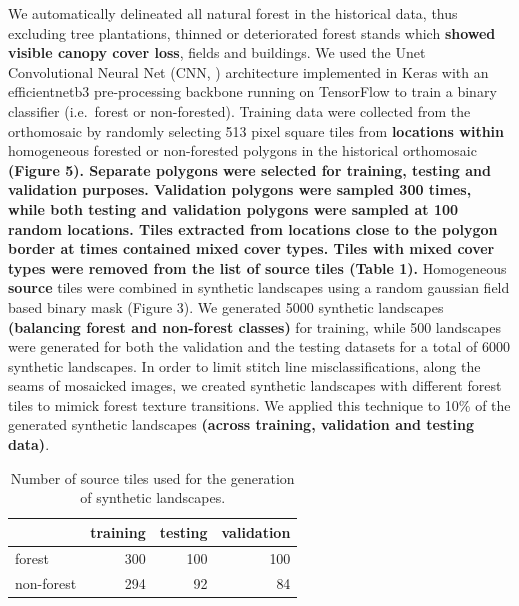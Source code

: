 \documentclass[remote sensing,article,submit,moreauthors,pdftex]{mdpi}
\begin{document}
We automatically delineated all natural forest in the historical data,
thus excluding tree plantations, thinned or deteriorated forest stands
which \textbf{showed visible canopy cover loss}, fields and buildings.
We used the Unet Convolutional Neural Net (CNN, \citet{ronneberger2015})
architecture implemented in Keras \citep{chollet2015} with an
efficientnetb3 pre-processing backbone \citep{yakubovskiy2019} running
on TensorFlow \citep{martinabadi2015} to train a binary classifier
(i.e.~forest or non-forested). Training data were collected from the
orthomosaic by randomly selecting 513 pixel square tiles from
\textbf{locations within} homogeneous forested or non-forested polygons
in the historical orthomosaic \textbf{(Figure 5). Separate polygons were
selected for training, testing and validation purposes. Validation
polygons were sampled 300 times, while both testing and validation
polygons were sampled at 100 random locations. Tiles extracted from
locations close to the polygon border at times contained mixed cover
types. Tiles with mixed cover types were removed from the list of source
tiles (Table 1).} Homogeneous \textbf{source} tiles were combined in
synthetic landscapes using a random gaussian field based binary mask
(Figure 3). We generated 5000 synthetic landscapes \textbf{(balancing
forest and non-forest classes)} for training, while 500 landscapes were
generated for both the validation and the testing datasets for a total
of 6000 synthetic landscapes. In order to limit stitch line
misclassifications, along the seams of mosaicked images, we created
synthetic landscapes with different forest tiles to mimick forest
texture transitions. We applied this technique to 10\% of the generated
synthetic landscapes \textbf{(across training, validation and testing
data)}.

\begin{table}[!h]

\caption{\label{tab:unnamed-chunk-3}Number of source tiles used for the generation of synthetic landscapes.}
\centering
\begin{tabular}[t]{lrrr}
\toprule
  & training & testing & validation\\
\midrule
forest & 300 & 100 & 100\\
non-forest & 294 & 92 & 84\\
\bottomrule
\end{tabular}
\end{table}
\end{document}
